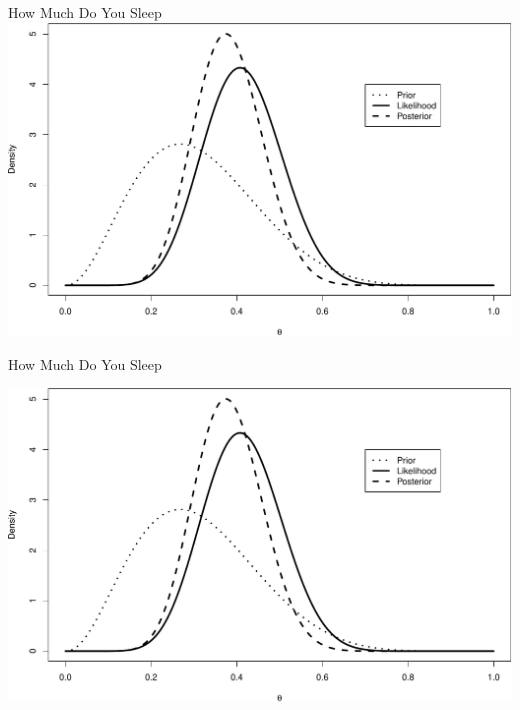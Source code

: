 \documentclass[
  ignorenonframetext,
]{beamer}
\begin{document}
\begin{frame}[fragile]{How Much Do You Sleep}
\includegraphics{01-intro-to-Bayes_files/figure-beamer/unnamed-chunk-7-1.pdf}

\end{frame}

\begin{frame}{How Much Do You Sleep}
\protect\hypertarget{how-much-do-you-sleep-5}{}

\includegraphics{01-intro-to-Bayes_files/figure-beamer/unnamed-chunk-8-1.pdf}

\end{frame}
\end{document}
